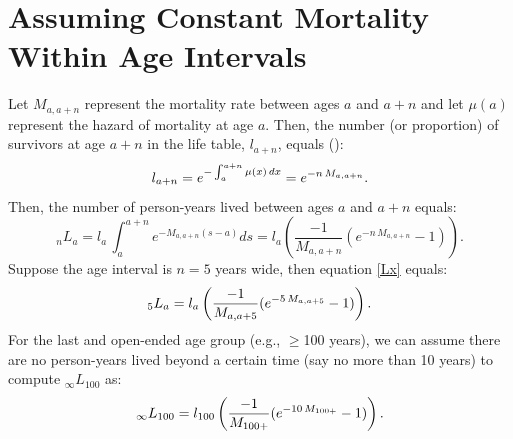 \documentclass[11pt,letterpaper]{article}
\theoremstyle{plain}
\theoremstyle{remark}
\numberwithin{equation}{section}
\begin{document}
\section{Assuming Constant Mortality Within Age Intervals}
Let $M_{a,a+n}$ represent the mortality rate between ages $a$ and
$a+n$ and let $\mu(a)$ represent the hazard of mortality at age
$a$. Then, the number (or proportion) of survivors at age $a+n$ in the
life table, $l_{a+n}$, equals (\cite{PreHeuGui00}):
\begin{equation}
l_{a+n}=e^{-\int_a^{a+n}\mu(x)\,dx}=e^{-n\,M_{a,a+n}}.\notag
\end{equation}
Then, the number of person-years lived between ages $a$ and $a+n$ equals:
\begin{equation}
_nL_{a}=l_a\,\int_a^{a+n} e^{-M_{a,a+n}(s-a)} ds=l_a \left(\frac{-1}{M_{a,a+n}}(e^{-n\,M_{a,a+n}}-1) \right).
\label{Lx}
\end{equation}
Suppose the age interval is $n=5$ years wide, then equation \eqref{Lx}
equals:
\begin{equation}
_5L_{a}=l_a \left(\frac{-1}{M_{a,a+5}}(e^{-5\,M_{a,a+5}}-1) \right).\notag
\end{equation}
For the last and open-ended age group (e.g., $\geq$100 years), we can assume there
are no person-years lived beyond a certain time (say no more than 10
years) to compute $_{\infty}L_{100}$ as:
\begin{equation}
_{\infty}L_{100}=l_{100} \left(\frac{-1}{M_{100+}}(e^{-10\,M_{100+}}-1) \right).\notag
\end{equation}


\newpage
\end{document}
